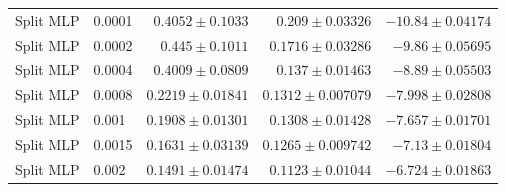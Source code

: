 \begin{longtable}{llrrr}
Split MLP & 0.0001 & $0.4052\pm 0.1033$ & $0.209\pm 0.03326$ & $-10.84\pm 0.04174$\\
Split MLP & 0.0002 & $0.445\pm 0.1011$ & $0.1716\pm 0.03286$ & $-9.86\pm 0.05695$\\
Split MLP & 0.0004 & $0.4009\pm 0.0809$ & $0.137\pm 0.01463$ & $-8.89\pm 0.05503$\\
Split MLP & 0.0008 & $0.2219\pm 0.01841$ & $0.1312\pm 0.007079$ & $-7.998\pm 0.02808$\\
Split MLP & 0.001 & $0.1908\pm 0.01301$ & $0.1308\pm 0.01428$ & $-7.657\pm 0.01701$\\
Split MLP & 0.0015 & $0.1631\pm 0.03139$ & $0.1265\pm 0.009742$ & $-7.13\pm 0.01804$\\
Split MLP & 0.002 & $0.1491\pm 0.01474$ & $0.1123\pm 0.01044$ & $-6.724\pm 0.01863$\\
\bottomrule\end{longtable}
